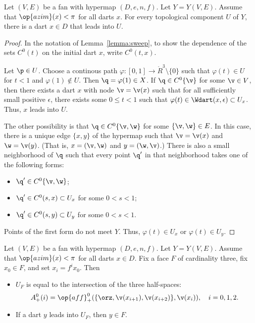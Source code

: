 \begin{lemma}\label{lemma:lead-exists}
Let $(V,E)$ be a fan with hypermap $(D,e,n,f)$. Let $Y=Y(V,E)$. Assume that $\op{azim}(x)<\pi$ for all darts $x$.  For every topological component $U$ of $Y$, there is a dart $x\in D$ that leads into $U$.
\end{lemma}
%
%
%

\begin{proof}  
In the notation of Lemma~\ref{lemma:sweep}, to show the dependence of the sets $C^0(t)$ on the initial dart $x$, write $C^0(t,x)$.

Let $\p\in U$.  Choose a continous path $\varphi:[0,1]\to \ring{R}^3\setminus\{0\}$
such that $\varphi(t)\in U$ for $t<1$ and $\varphi(1)\not\in U$.  Then
$\q=\varphi(1)\in X$.  If $\q\in C^0\{\v\}$ for some $\v\in V$,
then there exists a dart $x$ with node $\v = \v(x)$ such that for all sufficiently small positive $\epsilon$, there exists some $0\le t < 1$ such that  $\varphi(t)\in \Wdart(x,\epsilon)\subset U_x$.  
Thus, $x$ leads into $U$.
%

The other possibility is that
$\q\in C^0\{\v,\w\}$ for some $\{\v,\w\}\in E$.  In this case, there is a unique
edge $\{x,y\}$ of the hypermap such that $\v=\v(x)$ and $\w=\v(y)$.   (That is, $x=(\v,\w)$ and $y=(\w,\v)$.)
There
is also a small neighborhood of $\q$ such that every point $\q'$ in that neighborhood
takes one of the following forms:
\begin{itemize} \item $\q'\in C^0\{\v,\w\}$;
\item $\q'\in C^0(s,x)\subset U_x$ for some $0<s<1$;
\item $\q'\in C^0(s,y)\subset U_y$ for some $0<s<1$.
\end{itemize}
Points of the first form do not meet $Y$.  Thus,  $\varphi(t)\in U_x$ or $\varphi(t)\in U_y$.  
\end{proof}

\begin{lemma} \label{lemma:triangle}
Let $(V,E)$ be a fan with hypermap $(D,e,n,f)$. 
Let $Y=Y(V,E)$.
Assume that $\op{azim}(x)<\pi$
for all darts $x\in D$.  Fix a face $F$ of cardinality three, fix
$x_0\in F$, and set $x_i = f^i x_0$. Then
%
\begin{itemize}  
\item $U_F$ is equal to the intersection of the three half-spaces:
$$A^0_+(i)=\op{aff}_+^0(\{\orz,\v(x_{i+1}),\v(x_{i+2})\},\v(x_i)),\quad i=0,1,2.$$
\item If a dart $y$ leads into $U_F$, then $y\in F$.
\end{itemize}
\end{lemma}
%

